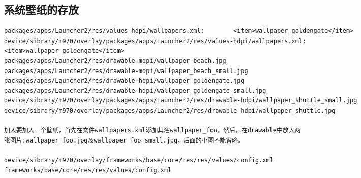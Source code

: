 \documentclass[a4paper,11pt,twoside,openany]{article}%
\begin{document}
\begin{CJK}{UTF8}{song}
\subsection{系统壁纸的存放}
\begin{lstlisting}
packages/apps/Launcher2/res/values-hdpi/wallpapers.xml:        <item>wallpaper_goldengate</item>
device/sibrary/m970/overlay/packages/apps/Launcher2/res/values-hdpi/wallpapers.xml:        <item>wallpaper_goldengate</item>
packages/apps/Launcher2/res/drawable-mdpi/wallpaper_beach.jpg
packages/apps/Launcher2/res/drawable-mdpi/wallpaper_beach_small.jpg
packages/apps/Launcher2/res/drawable-hdpi/wallpaper_goldengate.jpg
packages/apps/Launcher2/res/drawable-hdpi/wallpaper_goldengate_small.jpg
device/sibrary/m970/overlay/packages/apps/Launcher2/res/drawable-hdpi/wallpaper_shuttle_small.jpg
device/sibrary/m970/overlay/packages/apps/Launcher2/res/drawable-hdpi/wallpaper_shuttle.jpg

加入要加入一个壁纸，首先在文件wallpapers.xml添加其名wallpaper_foo，然后，在drawable中放入两
张图片:wallpaper_foo.jpg及wallpaper_foo_small.jpg，后面的小图不能省略。

device/sibrary/m970/overlay/frameworks/base/core/res/res/values/config.xml
frameworks/base/core/res/res/values/config.xml
\end{lstlisting}


\end{CJK}
\end{document}
